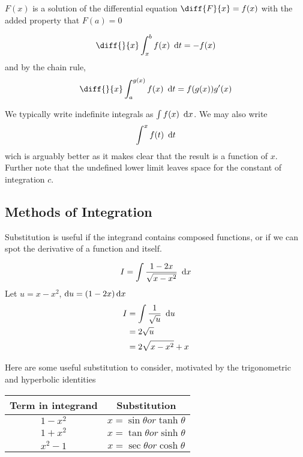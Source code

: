 \documentclass{article}
\begin{document}
\begin{remark}
    $F(x)$ is a solution of the differential equation $\diff{F}{x} = f(x)$ with the added property that $F(a) = 0$
\end{remark}

\begin{cor}
\[
    \diff{}{x}\int_{x}^{b}{f(x) \ \diffd t} = -f(x)
\]
and by the chain rule, 
\[
    \diff{}{x}\int_{a}^{g(x)}{f(x) \ \diffd t} = f(g(x))g'(x)
\]
\end{cor}

\begin{notation}
    We typically write indefinite integrals as $\int{f(x) \ \mathop{}\!\mathrm{d}x}$. We may also write
    \[
        \int^{x}{f(t) \ \mathop{}\!\mathrm{d} t}    
    \]
    wich is arguably better as it makes clear that the result is a function of $x$. Further note that the undefined lower limit leaves space for the constant of integration $c$.
\end{notation}

\subsection{Methods of Integration}

\begin{defi}[Substitution]
    Substitution is useful if the integrand contains composed functions, or if we can spot the derivative of a function and itself.
\end{defi}
\begin{eg}
    \[
        I = \int{\frac{1 - 2x}{\sqrt{x - x^2}} \ \diffd x}
    \]
    Let $u = x - x^2$, $\mathop{}\!\mathrm{d} u = (1 - 2x) \mathop{}\!\mathrm{d} x$
    \begin{align*}
        I &= \int{\frac{1}{\sqrt{u}} \ \mathop{}\!\mathrm{d}u} \\
        &= 2\sqrt{u} \\
        &= 2\sqrt{x - x^2} + x
    \end{align*}
\end{eg}
Here are some useful substitution to consider, motivated by the trigonometric and hyperbolic identities
\begin{center}
    \begin{tabular}{c | c}
        Term in integrand & Substitution \\
        \midrule
        $1 - x^2$ & $x = \sin{\theta} or \tanh{\theta}$\\
        $1 + x^2$ & $x = \tan{\theta} or \sinh{\theta}$\\
        $x^2 - 1$ & $x = \sec{\theta} or \cosh{\theta}$\\

    \end{tabular}
\end{center}
\end{document}

